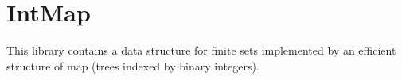 \section{IntMap}\label{IntMap}

This library contains a data structure for finite sets implemented by
an efficient structure of map (trees indexed by binary integers).

